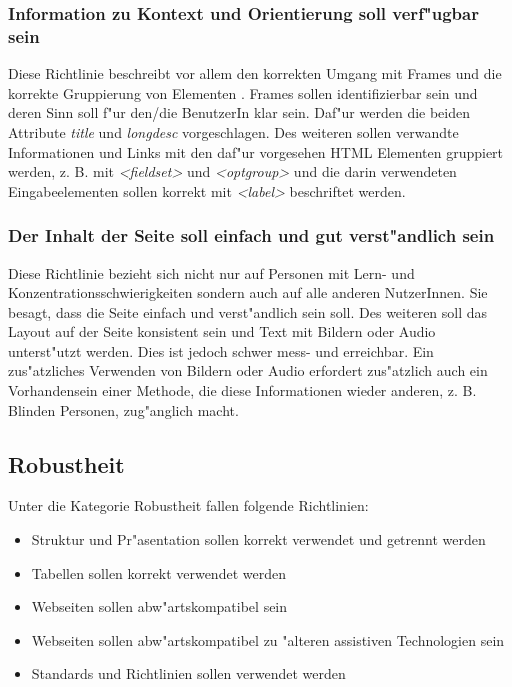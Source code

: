 \documentclass[a4paper,bibtotoc,oneside]{scrbook}
\begin{document}
\subsubsection{Information zu Kontext und Orientierung soll verf"ugbar sein}
Diese Richtlinie beschreibt vor allem den korrekten Umgang mit Frames und die korrekte Gruppierung von Elementen \cite[S. 50]{barr_webd}. Frames sollen identifizierbar sein und deren Sinn soll f"ur den/die BenutzerIn klar sein. Daf"ur werden die beiden Attribute \emph{title} und \emph{longdesc} vorgeschlagen. Des weiteren sollen verwandte Informationen und Links mit den daf"ur vorgesehen HTML Elementen gruppiert werden, z. B. mit \emph{<fieldset>} und \emph{<optgroup>} und die darin verwendeten Eingabeelementen sollen korrekt mit \emph{<label>} beschriftet werden. 
\cite[Abschnitt 6.12]{wcag1}

\subsubsection{Der Inhalt der Seite soll einfach und gut verst"andlich sein}
Diese Richtlinie bezieht sich nicht nur auf Personen mit Lern- und Konzentrationsschwierigkeiten sondern auch auf alle anderen NutzerInnen. Sie besagt, dass die Seite einfach und verst"andlich sein soll. Des weiteren soll das Layout auf der Seite konsistent sein und Text mit Bildern oder Audio unterst"utzt werden. \cite[Abschnitt 6.14]{wcag1}
Dies ist jedoch schwer mess- und erreichbar. Ein zus"atzliches Verwenden von Bildern oder Audio erfordert zus"atzlich auch ein Vorhandensein einer Methode, die diese Informationen wieder anderen, z. B. Blinden Personen, zug"anglich macht. \cite[S. 52]{barr_webd}

\subsection{Robustheit}
Unter die Kategorie Robustheit fallen folgende Richtlinien: 


\begin{itemize}
\item Struktur und Pr"asentation sollen korrekt verwendet und getrennt werden\cite[Abschnitt 6.3]{wcag1}
\item Tabellen sollen korrekt verwendet werden\cite[Abschnitt 6.5]{wcag1}
\item Webseiten sollen abw"artskompatibel sein\cite[Abschnitt 6.6]{wcag1}
\item Webseiten sollen abw"artskompatibel zu "alteren assistiven Technologien sein\cite[Abschnitt 6.10]{wcag1}
\item Standards und Richtlinien sollen verwendet werden\cite[Abschnitt 6.11]{wcag1}
\end{itemize}
\end{document}
